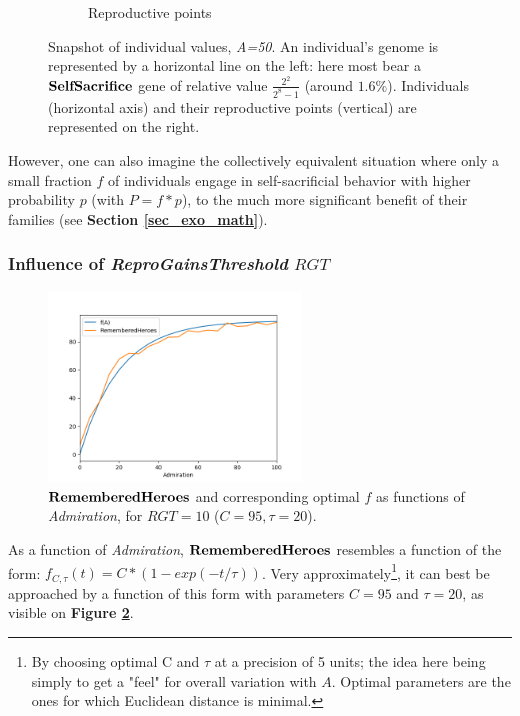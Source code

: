 \documentclass[a4paper,12pt]{article}
\begin{document}
\begin{figure}[h]
\begin{subfigure}[b]{0.3\linewidth}
        \caption{Reproductive points}
    \end{subfigure}
    \caption{Snapshot of individual values, \emph{A=50}. An individual's genome is represented by a horizontal line on the left: here most bear a $\bf{SelfSacrifice}$ gene
    of relative value $\frac{2^2}{2^8-1}$ (around $1.6\%$). Individuals (horizontal axis) and their reproductive points (vertical) are represented on the right.}
    \label{fig:Snap}
    \end{figure}


 However, one can also imagine the collectively equivalent situation where only a small fraction $f$ of individuals
 engage in self-sacrificial behavior with higher probability $p$ (with $P = f*p$), to the much more
 significant benefit of their families (see \textbf{Section \ref{sec_exo_math}}).

\subsubsection{Influence of \emph{ReproGainsThreshold} $RGT$}

\begin{figure}[h]
    \centering
    \includegraphics[width=0.6\textwidth]{f_rgt10}
    \caption{$\bf{RememberedHeroes}$ and corresponding optimal $f$ as functions of 
    \emph{Admiration}, for $RGT=10$ ($C=95, \tau = 20$).}
    \label{fig:f_10}
    \end{figure}

As a function of \emph{Admiration}, $\bf{RememberedHeroes}$ resembles a function of the form:
$f_{C,\tau}(t) = C*(1-exp(-t/\tau))$.
Very approximately\footnote{By choosing optimal C and $\tau$ at a precision of 5 units;
the idea here being simply to get a "feel" for overall variation with $A$. Optimal parameters are the
ones for which Euclidean distance is minimal.},
it can best be approached by a function of this form with parameters $C=95$ and $\tau = 20$, as visible
on \textbf{Figure \ref{fig:f_10}}.
\end{document}
